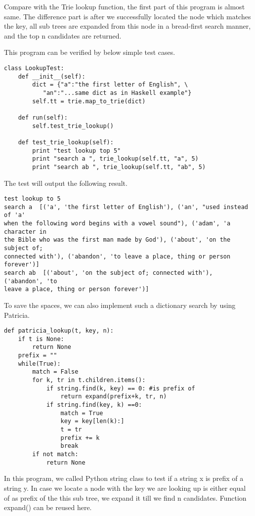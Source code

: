 \documentclass{article}
\begin{document}
Compare with the Trie lookup function, the first part of this program is almost
same. The difference part is after we successfully located the node which matches the key, all sub trees are expanded from this node in a bread-first search manner, and the top n candidates are returned. 

This program can be verified by below simple test cases.

\begin{lstlisting}
class LookupTest:
    def __init__(self):
        dict = {"a":"the first letter of English", \
           "an":"...same dict as in Haskell example"}
        self.tt = trie.map_to_trie(dict)

    def run(self):
        self.test_trie_lookup()

    def test_trie_lookup(self):
        print "test lookup top 5"
        print "search a ", trie_lookup(self.tt, "a", 5)
        print "search ab ", trie_lookup(self.tt, "ab", 5)
\end{lstlisting}

The test will output the following result.

\begin{verbatim}
test lookup to 5
search a  [('a', 'the first letter of English'), ('an', "used instead of 'a' 
when the following word begins with a vowel sound"), ('adam', 'a character in 
the Bible who was the first man made by God'), ('about', 'on the subject of; 
connected with'), ('abandon', 'to leave a place, thing or person forever')]
search ab  [('about', 'on the subject of; connected with'), ('abandon', 'to 
leave a place, thing or person forever')]
\end{verbatim}

To save the spaces, we can also implement such a dictionary search by using
Patricia.

\begin{lstlisting}
def patricia_lookup(t, key, n):
    if t is None:
        return None
    prefix = ""
    while(True):
        match = False
        for k, tr in t.children.items():
            if string.find(k, key) == 0: #is prefix of
                return expand(prefix+k, tr, n)
            if string.find(key, k) ==0:
                match = True
                key = key[len(k):]
                t = tr
                prefix += k
                break
        if not match:
            return None
\end{lstlisting}

In this program, we called Python string class to test if a string x is
prefix of a string y. In case we locate a node with the key we are looking
up is either equal of as prefix of the this sub tree, we expand it till
we find n candidates. Function expand() can be reused here.
\end{document}
